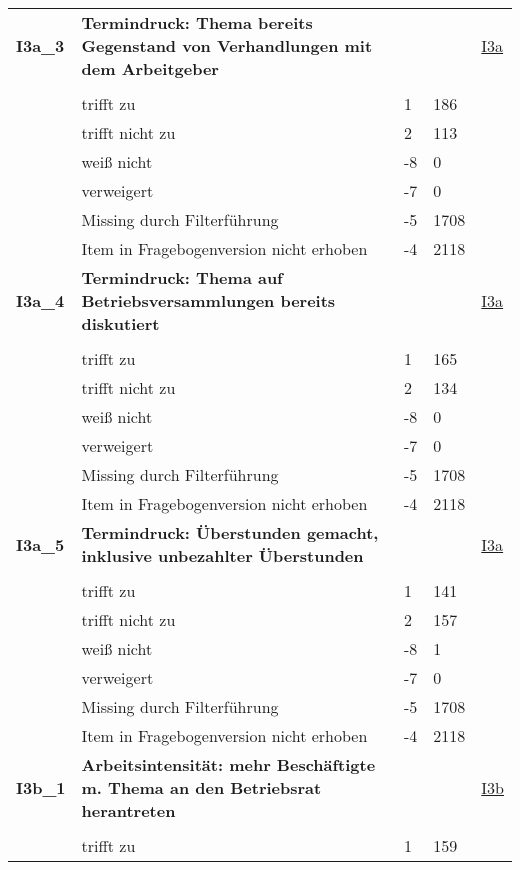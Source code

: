 \begin{longtable}{| L{2.5cm} | L{8.25cm}| C{1.5cm} | R{1.25cm} | C{2.25cm} |  }
   \midrule
\textbf{I3a\_3}\label{var:suf:I3a:3} & \textbf{Termindruck: Thema bereits Gegenstand von Verhandlungen mit dem Arbeitgeber} &  &  & \hyperref[I3a]{I3a} \\ 
   &  &  &  &  \\ 
   & trifft zu & 1 & 186 &  \\ 
   & trifft nicht zu & 2 & 113 &  \\ 
   & weiß nicht & -8 & 0 &  \\ 
   & verweigert & -7 & 0 &  \\ 
   & Missing durch Filterführung & -5 & 1708 &  \\ 
   & Item in Fragebogenversion nicht erhoben & -4 & 2118 &  \\ 
   \midrule
\textbf{I3a\_4}\label{var:suf:I3a:4} & \textbf{Termindruck: Thema auf Betriebsversammlungen bereits diskutiert} &  &  & \hyperref[I3a]{I3a} \\ 
   &  &  &  &  \\ 
   & trifft zu & 1 & 165 &  \\ 
   & trifft nicht zu & 2 & 134 &  \\ 
   & weiß nicht & -8 & 0 &  \\ 
   & verweigert & -7 & 0 &  \\ 
   & Missing durch Filterführung & -5 & 1708 &  \\ 
   & Item in Fragebogenversion nicht erhoben & -4 & 2118 &  \\ 
   \midrule
\textbf{I3a\_5}\label{var:suf:I3a:5} & \textbf{Termindruck: Überstunden gemacht, inklusive unbezahlter Überstunden} &  &  & \hyperref[I3a]{I3a} \\ 
   &  &  &  &  \\ 
   & trifft zu & 1 & 141 &  \\ 
   & trifft nicht zu & 2 & 157 &  \\ 
   & weiß nicht & -8 & 1 &  \\ 
   & verweigert & -7 & 0 &  \\ 
   & Missing durch Filterführung & -5 & 1708 &  \\ 
   & Item in Fragebogenversion nicht erhoben & -4 & 2118 &  \\ 
   \midrule
\textbf{I3b\_1}\label{var:suf:I3b:1} & \textbf{Arbeitsintensität: mehr Beschäftigte m. Thema an den Betriebsrat herantreten} &  &  & \hyperref[I3b]{I3b} \\ 
   &  &  &  &  \\ 
   & trifft zu & 1 & 159 &  \\ 

\end{longtable}
